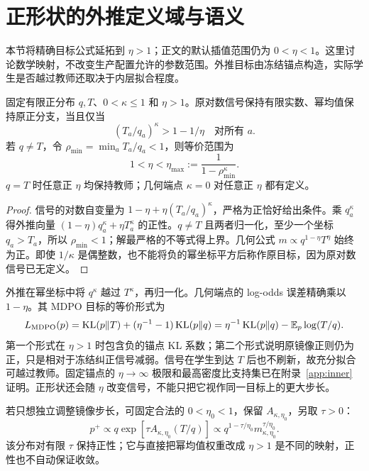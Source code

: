 \section{正形状的外推定义域与语义}
\label{sec:positive-extrapolation}
本节将精确目标公式延拓到 $\eta>1$；正文的默认插值范围仍为 $0<\eta<1$。这里讨论数学映射，不改变生产配置允许的参数范围。外推目标由冻结锚点构造，实际学生是否越过教师还取决于内层拟合程度。

\begin{proposition}[幂均值外推的正性条件]
\label{prop:extrapolation-domain}
固定有限正分布 $q,T$、$0<\kappa\le1$ 和 $\eta>1$。原对数信号保持有限实数、幂均值保持原正分支，当且仅当
\begin{equation}
(T_a/q_a)^\kappa>1-1/\eta\quad\text{对所有 }a.
\end{equation}
若 $q\ne T$，令 $\rho_{\min}=\min_aT_a/q_a<1$，则等价范围为
\begin{equation}
1<\eta<\eta_{\max}:=\frac1{1-\rho_{\min}^{\kappa}}.
\end{equation}
$q=T$ 时任意正 $\eta$ 均保持教师；几何端点 $\kappa=0$ 对任意正 $\eta$ 都有定义。
\end{proposition}
\begin{proof}
信号的对数自变量为 $1-\eta+\eta(T_a/q_a)^\kappa$，严格为正恰好给出条件。乘 $q_a^\kappa$ 得外推向量 $(1-\eta)q_a^\kappa+\eta T_a^\kappa$ 的正性。$q\ne T$ 且两者归一化，至少一个坐标 $q_a>T_a$，所以 $\rho_{\min}<1$；解最严格的不等式得上界。几何公式 $m\propto q^{1-\eta}T^\eta$ 始终为正。即使 $1/\kappa$ 是偶整数，也不能将负的幂坐标平方后称作原目标，因为原对数信号已无定义。
\end{proof}

外推在幂坐标中将 $q^\kappa$ 越过 $T^\kappa$，再归一化。几何端点的 log-odds 误差精确乘以 $1-\eta$。其 MDPO 目标的等价形式为
\begin{equation}
L_{\rm MDPO}(p)=\operatorname{KL}(p\Vert T)+(\eta^{-1}-1)\operatorname{KL}(p\Vert q)
=\eta^{-1}\operatorname{KL}(p\Vert q)-\mathbb E_p\log(T/q).
\end{equation}
第一个形式在 $\eta>1$ 时包含负的锚点 KL 系数；第二个形式说明原镜像正则仍为正，只是相对于冻结纠正信号减弱。信号在学生到达 $T$ 后也不刷新，故充分拟合可越过教师。固定锚点的 $\eta\to\infty$ 极限和最高密度比支持集已在附录~\ref{app:inner} 证明。正形状还会随 $\eta$ 改变信号，不能只把它视作同一目标上的更大步长。

若只想独立调整镜像步长，可固定合法的 $0<\eta_0<1$，保留 $A_{\kappa,\eta_0}$，另取 $\tau>0$：
\begin{equation}
p^+\propto q\exp[\tau A_{\kappa,\eta_0}(T/q)]
\propto q^{1-\tau/\eta_0}m_{\kappa,\eta_0}^{\tau/\eta_0}.
\end{equation}
该分布对有限 $\tau$ 保持正性；它与直接把幂均值权重改成 $\eta>1$ 是不同的映射，正性也不自动保证收敛。

